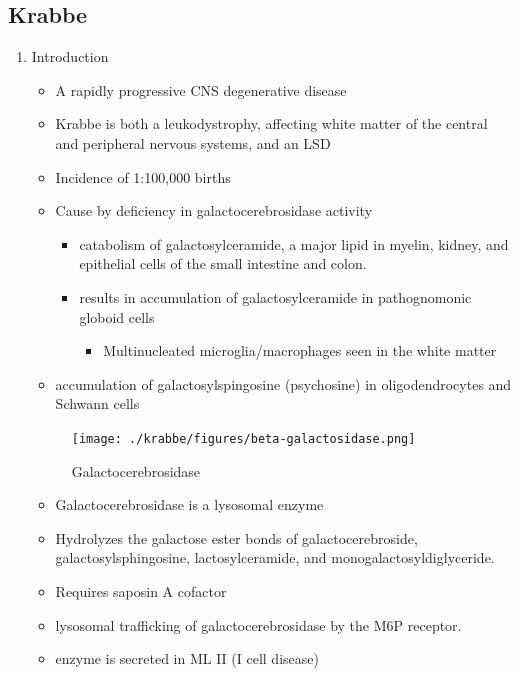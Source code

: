 \documentclass{scrartcl}
\begin{document}
\subsection{Krabbe}
\label{sec:org134b0f8}
\begin{enumerate}
\item Introduction
\label{sec:org6777635}
\begin{itemize}
\item A rapidly progressive CNS degenerative disease
\item Krabbe is both a leukodystrophy, affecting white matter of the central
and peripheral nervous systems, and an LSD

\item Incidence of 1:100,000 births
\item Cause by deficiency in galactocerebrosidase activity
\begin{itemize}
\item catabolism of galactosylceramide, a major lipid in myelin, kidney, and epithelial cells of the small intestine and colon.
\item results in accumulation of galactosylceramide in pathognomonic globoid cells
\begin{itemize}
\item Multinucleated microglia/macrophages seen in the white matter
\end{itemize}
\end{itemize}
\item accumulation of galactosylspingosine (psychosine) in oligodendrocytes and Schwann cells
\end{itemize}

\begin{figure}[htbp]
\centering
\texttt{[image: ./krabbe/figures/beta-galactosidase.png]}
\caption{\label{fig:org4b67025}
Galactocerebrosidase}
\end{figure}

\begin{itemize}
\item Galactocerebrosidase is a lysosomal enzyme
\item Hydrolyzes the galactose ester bonds of galactocerebroside, galactosylsphingosine, lactosylceramide, and monogalactosyldiglyceride.
\item Requires saposin A cofactor
\item lysosomal trafficking of galactocerebrosidase by the M6P receptor.
\item enzyme is secreted in ML II (I cell disease)
\end{itemize}


\end{enumerate}
\end{document}
